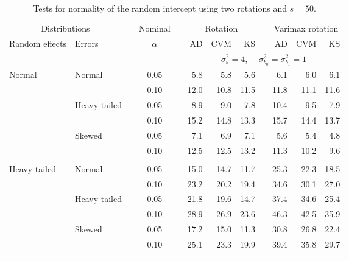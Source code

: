 \begin{table}[ht]
\caption{\label{tab:simb0s50-alt}Tests for normality of the random intercept using two rotations and $s = 50$.}
\begin{scriptsize}
\begin{center}
\begin{tabular}{ll p{.1cm} c p{.1cm} rrr p{.1cm} rrr}
  \hline
  \multicolumn{2}{c}{Distributions}& & Nominal & &  \multicolumn{3}{c}{Rotation} & & \multicolumn{3}{c}{Varimax rotation} \\ \cline{1-2} \cline{6-8} \cline{10-12}   
  Random effects & Errors & & $\alpha$ & & AD & CVM & KS & & AD & CVM & KS \\ 
   \hline
& && && \multicolumn{7}{c}{$\sigma_{\varepsilon}^2 = 4$, \ \ $\sigma_{b_0}^2 = \sigma_{b_1}^2 = 1$} \\ \cline{6-12}
\rowcolor{gray!20}Normal       & Normal       && 0.05 &&   5.8 & 5.8 & 5.6 &   & 6.1 & 6.0 & 6.1 \\ 
\rowcolor{gray!20}             &              && 0.10 &&   12.0 & 10.8 & 11.5 &   & 11.8 & 11.1 & 11.6 \\ 
\rowcolor{gray!20}             & Heavy tailed && 0.05 &&   8.9 & 9.0 & 7.8 &   & 10.4 & 9.5 & 7.9 \\ 
\rowcolor{gray!20}             &              && 0.10 &&   15.2 & 14.8 & 13.3 &   & 15.7 & 14.4 & 13.7 \\ 
\rowcolor{gray!20}             & Skewed       && 0.05 &&   7.1 & 6.9 & 7.1 &   & 5.6 & 5.4 & 4.8 \\ 
\rowcolor{gray!20}             &              && 0.10 &&   12.5 & 12.5 & 13.2 &   & 11.3 & 10.2 & 9.6 \\ 
&&&&&&&&&&&\\
Heavy tailed & Normal       && 0.05 &&   15.0 & 14.7 & 11.7 &   & 25.3 & 22.3 & 18.5 \\ 
             &              && 0.10 &&   23.2 & 20.2 & 19.4 &   & 34.6 & 30.1 & 27.0 \\ 
             & Heavy tailed && 0.05 &&   21.8 & 19.6 & 14.7 &   & 37.4 & 34.6 & 25.4 \\ 
             &              && 0.10 &&   28.9 & 26.9 & 23.6 &   & 46.3 & 42.5 & 35.9 \\ 
             & Skewed       && 0.05 &&   17.2 & 15.0 & 11.3 &   & 30.8 & 26.8 & 22.4 \\ 
             &              && 0.10 &&   25.1 & 23.3 & 19.9 &   & 39.4 & 35.8 & 29.7 \\ 
&&&&&&&&&&&\\

\end{tabular}
\end{center}
\end{scriptsize}
\end{table}
